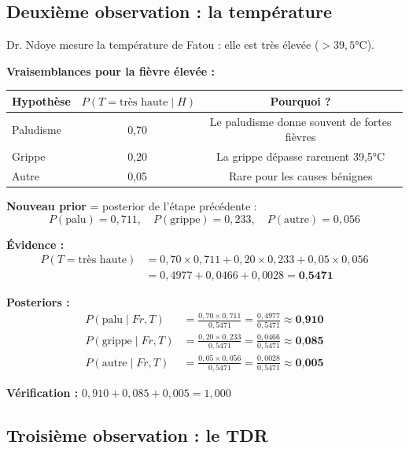 \documentclass[11pt,a4paper]{article}
\newcommand{\cmark}{\ding{51}}
\begin{document}
\subsection{Deuxième observation : la température}

Dr. Ndoye mesure la température de Fatou : elle est très élevée ($> 39{,}5$°C).

\textbf{Vraisemblances pour la fièvre élevée :}
\begin{center}
\begin{tabular}{lcc}
\toprule
\textbf{Hypothèse} & $P(T = \text{très haute} \mid H)$ & \textbf{Pourquoi ?} \\
\midrule
Paludisme & 0,70 & Le paludisme donne souvent de fortes fièvres \\
Grippe & 0,20 & La grippe dépasse rarement 39,5°C \\
Autre & 0,05 & Rare pour les causes bénignes \\
\bottomrule
\end{tabular}
\end{center}

\textbf{Nouveau prior} = posterior de l'étape précédente :
$$P(\text{palu}) = 0{,}711, \quad P(\text{grippe}) = 0{,}233, \quad P(\text{autre}) = 0{,}056$$

\textbf{Évidence :}
\begin{align*}
P(T = \text{très haute}) &= 0{,}70 \times 0{,}711 + 0{,}20 \times 0{,}233 + 0{,}05 \times 0{,}056 \\
&= 0{,}4977 + 0{,}0466 + 0{,}0028 = \textbf{0,5471}
\end{align*}

\textbf{Posteriors :}
\begin{align*}
P(\text{palu} \mid Fr, T) &= \frac{0{,}70 \times 0{,}711}{0{,}5471} = \frac{0{,}4977}{0{,}5471} \approx \textbf{0,910} \\[3pt]
P(\text{grippe} \mid Fr, T) &= \frac{0{,}20 \times 0{,}233}{0{,}5471} = \frac{0{,}0466}{0{,}5471} \approx \textbf{0,085} \\[3pt]
P(\text{autre} \mid Fr, T) &= \frac{0{,}05 \times 0{,}056}{0{,}5471} = \frac{0{,}0028}{0{,}5471} \approx \textbf{0,005}
\end{align*}

\textbf{Vérification :} $0{,}910 + 0{,}085 + 0{,}005 = 1{,}000$ \cmark

\subsection{Troisième observation : le TDR}
\end{document}
